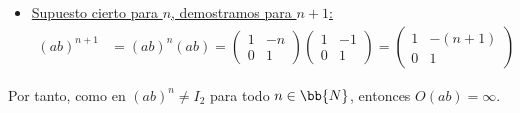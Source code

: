 \begin{ejercicio}
\begin{itemize}
        \item \ul{Supuesto cierto para $n$, demostramos para $n+1$:}
        \begin{align*}
            (ab)^{n+1}&=(ab)^n(ab)=\begin{pmatrix}
                1 & -n \\
                0 & 1
            \end{pmatrix}\begin{pmatrix}
                1 & -1 \\
                0 & 1
            \end{pmatrix}
            =\begin{pmatrix}
                1 & -(n+1) \\
                0 & 1
            \end{pmatrix}
        \end{align*}
    \end{itemize}

    Por tanto, como en $(ab)^n\neq I_2$ para todo $n\in\bb{N}$, entonces $O(ab)=\infty$.
\end{ejercicio}

